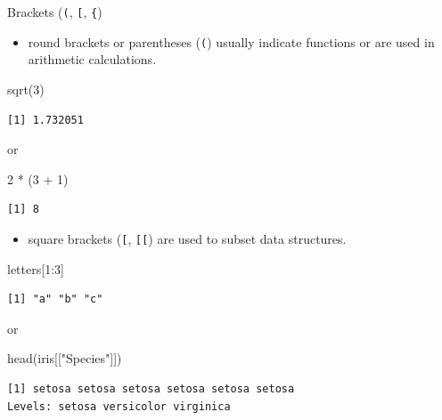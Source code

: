 \documentclass[ignorenonframetext,,t]{beamer}
\providecommand{\tightlist}{%
\setlength{\itemsep}{0pt}\setlength{\parskip}{0pt}}
\newenvironment{Shaded}{\begin{snugshade}}{\end{snugshade}}
\newcommand{\DecValTok}[1]{\textcolor[rgb]{0.00,0.00,0.81}{#1}}
\newcommand{\FunctionTok}[1]{\textcolor[rgb]{0.00,0.00,0.00}{#1}}
\newcommand{\NormalTok}[1]{#1}
\newcommand{\SpecialCharTok}[1]{\textcolor[rgb]{0.00,0.00,0.00}{#1}}
\newcommand{\StringTok}[1]{\textcolor[rgb]{0.31,0.60,0.02}{#1}}
\providecommand{\tightlist}{%
\setlength{\itemsep}{0pt}\setlength{\parskip}{0pt}}
\renewcommand{\tightlist}{\setlength{\itemsep}{1.4ex}\setlength{\parskip}{0pt}}
\begin{document}
\begin{frame}[fragile]
\begin{block}{Brackets (\texttt{(}, \texttt{{[}}, \texttt{\{})}
\protect\hypertarget{brackets}{}
\begin{itemize}
\tightlist
\item
  round brackets or parentheses (\texttt{(}) usually indicate functions
  or are used in arithmetic calculations.
\end{itemize}

\begin{Shaded}
\begin{Highlighting}[]
\FunctionTok{sqrt}\NormalTok{(}\DecValTok{3}\NormalTok{)}
\end{Highlighting}
\end{Shaded}

\begin{verbatim}
[1] 1.732051
\end{verbatim}

or

\begin{Shaded}
\begin{Highlighting}[]
\DecValTok{2} \SpecialCharTok{*}\NormalTok{ (}\DecValTok{3} \SpecialCharTok{+} \DecValTok{1}\NormalTok{)}
\end{Highlighting}
\end{Shaded}

\begin{verbatim}
[1] 8
\end{verbatim}
\end{block}
\end{frame}

\begin{frame}[fragile]
\begin{itemize}
\tightlist
\item
  square brackets (\texttt{{[}}, \texttt{{[}{[}}) are used to subset
  data structures.
\end{itemize}

\begin{Shaded}
\begin{Highlighting}[]
\NormalTok{letters[}\DecValTok{1}\SpecialCharTok{:}\DecValTok{3}\NormalTok{]}
\end{Highlighting}
\end{Shaded}

\begin{verbatim}
[1] "a" "b" "c"
\end{verbatim}

or

\begin{Shaded}
\begin{Highlighting}[]
\FunctionTok{head}\NormalTok{(iris[[}\StringTok{"Species"}\NormalTok{]])}
\end{Highlighting}
\end{Shaded}

\begin{verbatim}
[1] setosa setosa setosa setosa setosa setosa
Levels: setosa versicolor virginica
\end{verbatim}
\end{frame}
\end{document}
